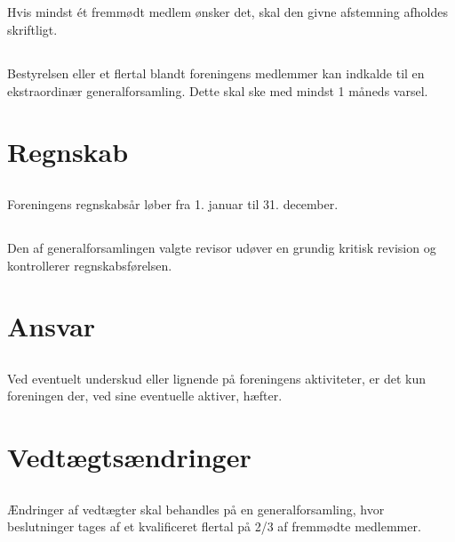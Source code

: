 \documentclass[danish,a4paper,twocolumn,oneside,article]{memoir}
\begin{document}
\section{} Hvis mindst ét fremmødt medlem ønsker det, skal den givne afstemning afholdes skriftligt.

\section{} Bestyrelsen eller et flertal blandt foreningens medlemmer kan indkalde til en ekstraordinær
generalforsamling. Dette skal ske med mindst 1 måneds varsel.


\chapter{Regnskab}

\section{} Foreningens regnskabsår løber fra 1. januar til 31. december.

\section{} Den af generalforsamlingen valgte revisor udøver en grundig kritisk revision og kontrollerer
regnskabsførelsen.


\chapter{Ansvar}

\section{} Ved eventuelt underskud eller lignende på foreningens aktiviteter, er det kun foreningen der, ved
sine eventuelle aktiver, hæfter.


\chapter{Vedtægtsændringer}

\section{} Ændringer af vedtægter skal behandles på en generalforsamling, hvor beslutninger tages af et kvalificeret flertal på 2/3 af fremmødte medlemmer.
\end{document}
